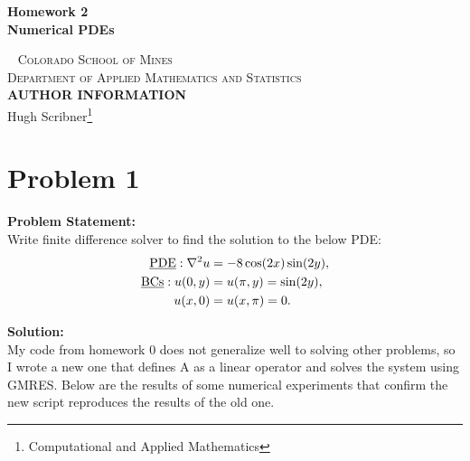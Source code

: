 \documentclass[12pt]{article}
\begin{document}
\newpage
\newpage
\newtheorem{theorem}{Theorem}

\begin{titlepage}

    \begin{center}
        \vspace*{2.5in}
            \huge
            \textbf{{Homework 2}}\\
            \large
            \textbf{Numerical PDEs}\\
    \end{center}
    ~\vfill
    \noindent \textsc{Colorado School of Mines}\\
    \textsc{Department of Applied Mathematics and Statistics}\\
    
    \vspace{1cm}
    \noindent \textsc{\textbf{AUTHOR INFORMATION}}\\
    \noindent Hugh Scribner\footnote{Computational and Applied Mathematics}\\ 
    \vspace{1mm}
    
\end{titlepage}

\newpage

\tableofcontents

\newpage

\newpage
\section{Problem 1}
 \begin{tcolorbox}
        \textbf{Problem Statement:}\\
        Write finite difference solver to find the solution to the below PDE:
        \begin{align*}
            \text{\underline{PDE}}: \nabla^2u &= -8\cos(2x)\sin(2y),\\
            \text{\underline{BCs}}: u(0,y) &= u(\pi,y) = \sin(2y),\\
            u(x,0) &= u(x,\pi) = 0.
        \end{align*}
    \end{tcolorbox}
    
    \textbf{Solution:}\\
    My code from homework 0 does not generalize well to solving other problems, so I wrote a new one that defines A as a linear operator and solves the system using GMRES. Below are the results of some numerical experiments that confirm the new script reproduces the results of the old one.
\end{document}
